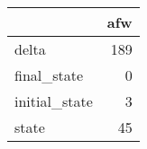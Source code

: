 \begin{tabular}{lr}
\toprule
{} &  afw \\
\midrule
delta         &  189 \\
final\_state   &    0 \\
initial\_state &    3 \\
state         &   45 \\
\bottomrule
\end{tabular}
